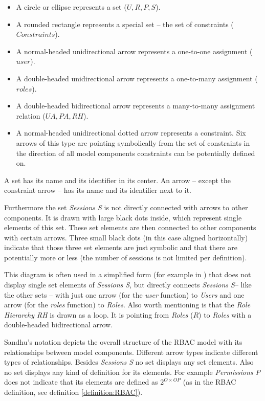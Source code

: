 \documentclass[twoside, openright, 12pt]{book}
\begin{document}
\begin{itemize}
\item A circle or ellipse represents a set ($U, R, P, S$).
\item A rounded rectangle represents a special set -- the set of constraints ($Constraints$).
\item A normal-headed unidirectional arrow represents a one-to-one assignment ($user$).
\item A double-headed unidirectional arrow represents a one-to-many assignment ($roles$).
\item A double-headed bidirectional arrow represents a many-to-many assignment relation ($UA, PA, RH$).
\item A normal-headed unidirectional dotted arrow represents a constraint.
Six arrows of this type are pointing symbolically from the set of constraints in the direction of all model components constraints can be potentially defined on.
\end{itemize}

\noindent
A set has its name and its identifier in its center.
An arrow -- except the constraint arrow -- has its name and its identifier next to it.

Furthermore the set \textit{Sessions S} is not directly connected with arrows to other components.
It is drawn with large black dots inside, which represent single elements of this set.
These set elements are then connected to other components with certain arrows.
Three small black dots (in this case aligned horizontally) indicate that those three set elements are just symbolic and that there are potentially more or less (the number of sessions is not limited per definition).

This diagram is often used in a simplified form (for example in \citep{Amthor18}) that does not display single set elements of \textit{Sessions S}, but directly connects \textit{Sessions S}-- like the other sets -- with just one arrow (for the \textit{user} function) to \textit{Users} and one arrow (for the \textit{roles} function) to \textit{Roles}.
Also worth mentioning is that the \textit{Role Hierarchy RH} is drawn as a loop. 
It is pointing from \textit{Roles} ($R$) to \textit{Roles} with a double-headed bidirectional arrow.

Sandhu's notation depicts the overall structure of the RBAC model with its relationships between model components.
Different arrow types indicate different types of relationships.
Besides \textit{Sessions S} no set displays any set elements.
Also no set displays any kind of definition for its elements.
For example \textit{Permissions P} does not indicate that its elements are defined as $2^{O \times OP}$ (as in the RBAC definition, see definition \ref{definition:RBAC}).
\end{document}
